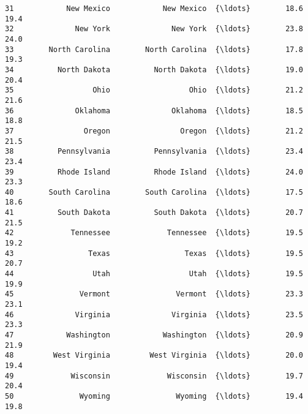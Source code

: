 \documentclass[11pt]{article}
\begin{document}
\begin{Verbatim}[commandchars=\\\{\}]
31            New Mexico            New Mexico  {\ldots}        18.6      19.4   
32              New York              New York  {\ldots}        23.8      24.0   
33        North Carolina        North Carolina  {\ldots}        17.8      19.3   
34          North Dakota          North Dakota  {\ldots}        19.0      20.4   
35                  Ohio                  Ohio  {\ldots}        21.2      21.6   
36              Oklahoma              Oklahoma  {\ldots}        18.5      18.8   
37                Oregon                Oregon  {\ldots}        21.2      21.5   
38          Pennsylvania          Pennsylvania  {\ldots}        23.4      23.4   
39          Rhode Island          Rhode Island  {\ldots}        24.0      23.3   
40        South Carolina        South Carolina  {\ldots}        17.5      18.6   
41          South Dakota          South Dakota  {\ldots}        20.7      21.5   
42             Tennessee             Tennessee  {\ldots}        19.5      19.2   
43                 Texas                 Texas  {\ldots}        19.5      20.7   
44                  Utah                  Utah  {\ldots}        19.5      19.9   
45               Vermont               Vermont  {\ldots}        23.3      23.1   
46              Virginia              Virginia  {\ldots}        23.5      23.3   
47            Washington            Washington  {\ldots}        20.9      21.9   
48         West Virginia         West Virginia  {\ldots}        20.0      19.4   
49             Wisconsin             Wisconsin  {\ldots}        19.7      20.4   
50               Wyoming               Wyoming  {\ldots}        19.4      19.8   


\end{Verbatim}
\end{document}
